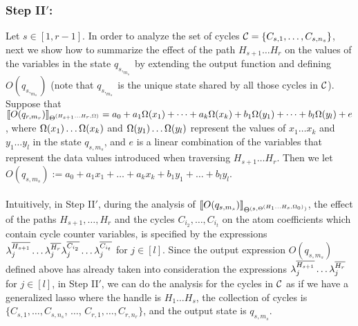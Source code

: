 \subsubsection{Step II$'$:}
Let $s\in [1,r-1]$. In order to analyze the set of cycles ${\mathcal{C} }=\{C_{s,1},\dots,C_{s,n_{s}}\}$, next we show how to summarize the effect of the path $H_{s+1}\dots H_r$ on the values of the variables in the state $q_{s,_{m_s}}$ by extending the output function and defining $O(q_{s,_{m_s}})$ (note that $q_{s,_{m_s}}$ is the unique state shared by all those cycles in ${\mathcal{C} }$).
Suppose that $\llbracket O(q_{r,m_r})\rrbracket_{\Theta^{(H_{s+1}\dots H_{r}, \Omega)}}=a_0+a_1 \Omega(x_1)+ \dots + a_k \Omega(x_k) + b_1 \Omega(y_1) + \dots + b_l \Omega(y_l)+e$, where $\Omega(x_1)\dots\Omega(x_k)$ and $\Omega(y_1)\ldots \Omega(y_l)$ represent the values of $x_1\dots x_k$ and $y_1 \dots y_l$ in the state $q_{s, m_{s}}$, and $e$ is a linear combination of the variables that represent the data values introduced when traversing $H_{s+1}\dots H_r$. 
Then we let
$O(q_{s, m_{s}}):=a_0+a_1 x_1 + \dots + a_k x_k + b_1 y_1 + \dots + b_l y_l$.
\medskip\\
\medskip\\
Intuitively, in Step II$'$, during the analysis of $\llbracket O(q_{s, m_{s}})\rrbracket_{\Theta^{({\mathfrak{s} },\Theta^{(H_1 \dots H_{s}, \Omega_0)} ) } }$, the effect of the paths $H_{s+1},  \dots,  H_r$ and the cycles $C_{i_{2}}, \dots, C_{i_{t}}$ on the atom coefficients which contain cycle counter variables, is specified by the expressions  $\lambda^{\overline{H_{s+1}}}_j \dots \lambda^{\overline{H_{r}}}_j  \lambda^{\overline{C_{i_{2}}}}_j \dots \lambda^{\overline{C_{i_{t}}}}_j $ for $j \in [l]$. Since the output expression $O(q_{s, m_{s}})$ defined above has already taken into consideration the expressions $\lambda^{\overline{H_{s+1}}}_j \dots \lambda^{\overline{H_{r}}}_j$ for $j \in [l]$, in Step II$'$, we can do the analysis for the cycles in ${\mathcal{C} }$ as if we have a generalized lasso where the handle is $H_1\dots H_s$, the collection of cycles is $\{C_{s,1},\dots, C_{s,n_s}$, $\dots$, $C_{r,1},\dots, C_{r,n_r}\}$, and the output state is $q_{s,m_s}$. 
